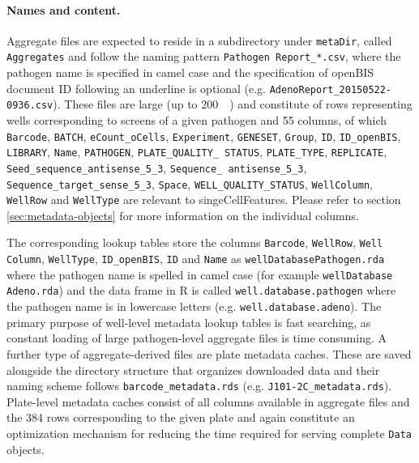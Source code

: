 \paragraph{Names and content.}
Aggregate files are expected to reside in a subdirectory under \texttt{metaDir}, called \texttt{Aggregates} and follow the naming pattern \texttt{Pathogen Report_*.csv}, where the pathogen name is specified in camel case and the specification of openBIS document ID following an underline is optional (e.g. \texttt{AdenoReport_20150522-0936.csv}). These files are large (up to \SI{200}{\mega\byte}) and constitute of rows representing wells corresponding to screens of a given patho\-gen and 55 columns, of which \texttt{Barcode}, \texttt{BATCH}, \texttt{eCount_oCells}, \texttt{Experiment}, \texttt{GENESET}, \texttt{Group}, \texttt{ID}, \texttt{ID_openBIS}, \texttt{LIBRARY}, \texttt{Name}, \texttt{PATHOGEN}, \texttt{PLATE_QUALITY_ STATUS}, \texttt{PLATE_TYPE}, \texttt{REPLICATE}, \texttt{Seed_sequence_antisense_5_3}, \texttt{Sequence_ antisense_5_3}, \texttt{Sequence_target_sense_5_3}, \texttt{Space}, \texttt{WELL_QUALITY_STATUS}, \texttt{WellColumn}, \texttt{WellRow} and \texttt{WellType} are relevant to singeCellFeatures. Please refer to section \ref{sec:metadata-objects} for more information on the individual columns.

The corresponding lookup tables store the columns \texttt{Barcode}, \texttt{WellRow}, \texttt{Well Column}, \texttt{WellType}, \texttt{ID_openBIS}, \texttt{ID} and \texttt{Name} as \texttt{wellDatabasePathogen.rda} where the pathogen name is spelled in camel case (for example \texttt{wellDatabase Adeno.rda}) and the data frame in R is called \texttt{well.database.pathogen} where the pathogen name is in lowercase letters (e.g. \texttt{well.database.adeno}). The primary purpose of well-level metadata lookup tables is fast searching, as constant loading of large pathogen-level aggregate files is time consuming. A further type of aggregate-derived files are plate metadata caches. These are saved alongside the directory structure that organizes downloaded data and their naming scheme follows \texttt{barcode_metadata.rds} (e.g. \texttt{J101-2C_metadata.rds}). Plate-level metadata caches consist of all columns available in aggregate files and the 384 rows corresponding to the given plate and again constitute an optimization mechanism for reducing the time required for serving complete \texttt{Data} objects.
